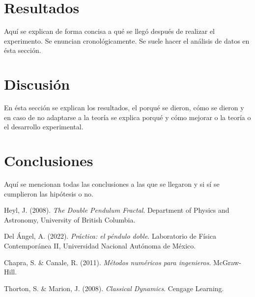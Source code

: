 \documentclass[11pt, twocolumn]{article}
\begin{document}

\section*{Resultados}
\label{sec:Resultados}

Aquí se explican de forma concisa a qué se llegó después de realizar el experimento. Se enuncian cronológicamente. Se suele hacer el análisis de datos en ésta sección.



\section*{Discusión}
\label{sec:Discusion}

En ésta sección se explican los resultados, el porqué se dieron, cómo se dieron y en caso de no adaptarse a la teoría se explica porqué y cómo mejorar o la teoría o el desarrollo experimental.



\section*{Conclusiones}
\label{sec:Conclusiones}

Aquí se mencionan todas las conclusiones a las que se llegaron y si sí se cumplieron las hipótesis o no.




\begin{thebibliography}{X} 

	 Heyl, J. (2008). \textit{The Double Pendulum Fractal}. Department of Physics	and Astronomy, University of British Columbia.
	
	 Del Ángel, A. (2022). \textit{Práctica: el péndulo doble}. Laboratorio de Física Contemporánea II, Universidad Nacional Autónoma de México.
	
	 Chapra, S. \& Canale, R. (2011). \textit{Métodos numéricos para ingenieros}. McGraw-Hill.
	
	 Thorton, S. \& Marion, J. (2008). \textit{Classical Dynamics}. Cengage Learning.
	
\end{thebibliography}
\end{document}
